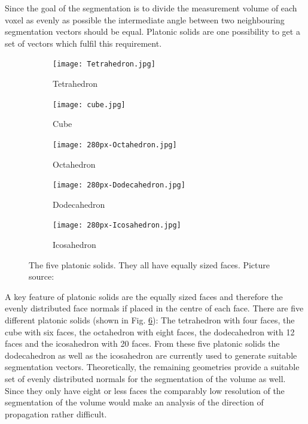 Since the goal of the segmentation is to divide the measurement volume of each voxel as evenly as possible the intermediate angle between two neighbouring segmentation vectors should be equal. Platonic solids are one possibility to get a set of vectors which fulfil this requirement.
\begin{figure}[H]
     \centering
     \begin{subfigure}[b]{0.19\textwidth}
         \centering
        \texttt{[image: Tetrahedron.jpg]}
         \caption{Tetrahedron}
         \label{fig:Tetrahedron}
     \end{subfigure}
     \hfill
     \begin{subfigure}[b]{0.19\textwidth}
         \centering
         \texttt{[image: cube.jpg]}
         \caption{Cube}
         \label{fig:cube}
     \end{subfigure}
     \hfill
     \begin{subfigure}[b]{0.19\textwidth}
         \centering
         \texttt{[image: 280px-Octahedron.jpg]}
         \caption{Octahedron}
         \label{fig:Octahedron}
     \end{subfigure}
     \hfill
     \begin{subfigure}[b]{0.19\textwidth}
         \centering
         \texttt{[image: 280px-Dodecahedron.jpg]}
         \caption{Dodecahedron}
         \label{fig:Dodecahedron}
     \end{subfigure}
     \hfill
     \begin{subfigure}[b]{0.19\textwidth}
         \centering
         \texttt{[image: 280px-Icosahedron.jpg]}
         \caption{Icosahedron}
         \label{fig:Icosahedro}
     \end{subfigure}
        \caption{The five platonic solids. They all have equally sized faces. Picture source: \cite{wiki_platonic}}
        \label{fig:platonic_solids}
\end{figure}

A key feature of platonic solids are the equally sized faces and therefore the evenly distributed face normals if placed in the centre of each face.
There are five different platonic solids (shown in Fig. \ref{fig:platonic_solids}): The tetrahedron with four faces, the cube with six faces, the octahedron with eight faces, the dodecahedron with 12 faces and the icosahedron with 20 faces.
From these five platonic solids the dodecahedron as well as the icosahedron are currently used to generate suitable segmentation vectors. Theoretically, the remaining geometries provide a suitable set of evenly distributed normals for the segmentation of the volume as well. Since they only have eight or less faces the comparably low resolution of the segmentation of the volume would make an analysis of the direction of propagation rather difficult.

